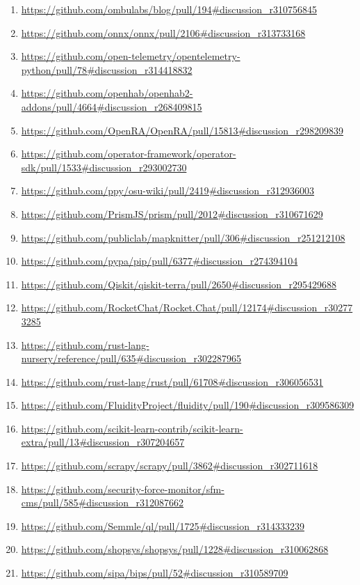 {\begin{enumerate}[topsep=0pt,itemsep=-1ex,partopsep=1ex,parsep=1ex]
    \item \url{https://github.com/ombulabs/blog/pull/194\#discussion_r310756845}
    \item \url{https://github.com/onnx/onnx/pull/2106\#discussion_r313733168}
    \item \url{https://github.com/open-telemetry/opentelemetry-python/pull/78\#discussion_r314418832}
    \item \url{https://github.com/openhab/openhab2-addons/pull/4664\#discussion_r268409815}
    \item \url{https://github.com/OpenRA/OpenRA/pull/15813\#discussion_r298209839}
    \item \url{https://github.com/operator-framework/operator-sdk/pull/1533\#discussion_r293002730}
    \item \url{https://github.com/ppy/osu-wiki/pull/2419\#discussion_r312936003}
    \item \url{https://github.com/PrismJS/prism/pull/2012\#discussion_r310671629}
    \item \url{https://github.com/publiclab/mapknitter/pull/306\#discussion_r251212108}
    \item \url{https://github.com/pypa/pip/pull/6377\#discussion_r274394104}
    \item \url{https://github.com/Qiskit/qiskit-terra/pull/2650\#discussion_r295429688}
    \item \url{https://github.com/RocketChat/Rocket.Chat/pull/12174\#discussion_r302773285}
    \item \url{https://github.com/rust-lang-nursery/reference/pull/635\#discussion_r302287965}
    \item \url{https://github.com/rust-lang/rust/pull/61708\#discussion_r306056531}
    \item \url{https://github.com/FluidityProject/fluidity/pull/190\#discussion_r309586309}
    \item \url{https://github.com/scikit-learn-contrib/scikit-learn-extra/pull/13\#discussion_r307204657}
    \item \url{https://github.com/scrapy/scrapy/pull/3862\#discussion_r302711618}
    \item \url{https://github.com/security-force-monitor/sfm-cms/pull/585\#discussion_r312087662}
    \item \url{https://github.com/Semmle/ql/pull/1725\#discussion_r314333239}
    \item \url{https://github.com/shopsys/shopsys/pull/1228\#discussion_r310062868}
    \item \url{https://github.com/sipa/bips/pull/52\#discussion_r310589709}

\end{enumerate}}
